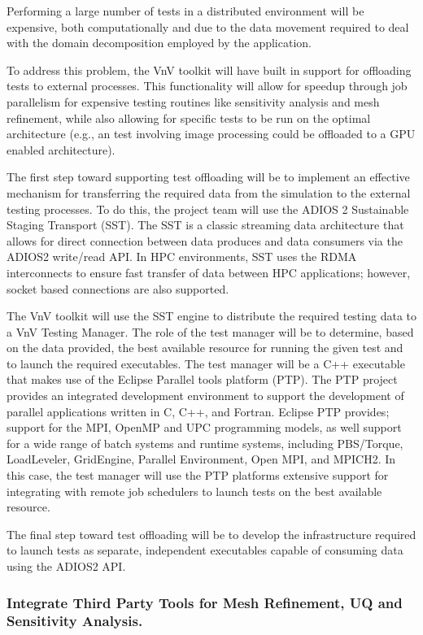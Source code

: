 Performing a large number of \VV tests in a distributed environment will be expensive, both computationally and due to the data movement required to deal with the domain decomposition employed by the application. 

To address this problem, the VnV toolkit will have built in support for offloading tests to external processes. This functionality will allow for speedup through job parallelism for expensive testing routines like sensitivity analysis and mesh refinement, while also allowing for specific tests to be run on the optimal architecture (e.g., an test involving image processing could be offloaded to a GPU enabled architecture).  

The first step toward supporting test offloading will be to implement an effective mechanism for transferring the required 
data from the simulation to the external testing processes. To do this, the project team will use the ADIOS 2 Sustainable Staging Transport (SST). The SST is a classic streaming data architecture that allows for direct connection between data produces and data consumers via the ADIOS2 write/read API. In HPC environments, SST uses the RDMA interconnects to ensure fast transfer of data between HPC applications; however, socket based connections are also supported. 

The VnV toolkit will use the SST engine to distribute the required testing data to a VnV Testing Manager. The role of the test manager will be to determine, based on the data provided, the best available resource for running the given test and to launch the required executables. The test manager will be a C++ executable that makes use of the Eclipse Parallel tools platform (PTP). The PTP project provides an integrated development environment to support the development of parallel applications written in C, C++, and Fortran. Eclipse PTP provides; support for the MPI, OpenMP and UPC programming models, as well support for a wide range of batch systems and runtime systems, including PBS/Torque, LoadLeveler, GridEngine, Parallel Environment, Open MPI, and MPICH2. In this case, the test manager will use the PTP platforms extensive support for integrating with remote job schedulers to launch tests on the best available resource. 

The final step toward test offloading will be to develop the infrastructure required to launch tests as separate, independent executables capable of consuming data using the ADIOS2 API.   

\subsubsection{Integrate Third Party Tools for Mesh Refinement, UQ and Sensitivity Analysis.}

